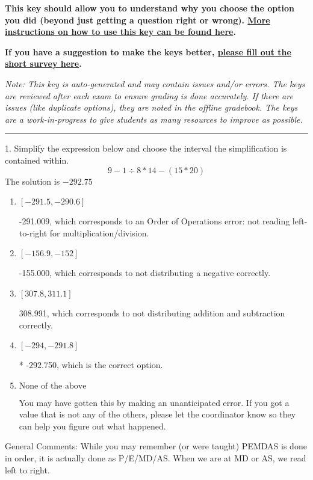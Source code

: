 \documentclass{article}[14pt]
\begin{document}
\textbf{This key should allow you to understand why you choose the option you did (beyond just getting a question right or wrong). \href{https://xronos.clas.ufl.edu/mac1105spring2020/courseDescriptionAndMisc/Exams/LearningFromResults}{More instructions on how to use this key can be found here}.}

\textbf{If you have a suggestion to make the keys better, \href{https://forms.gle/CZkbZmPbC9XALEE88}{please fill out the short survey here}.}

\textit{Note: This key is auto-generated and may contain issues and/or errors. The keys are reviewed after each exam to ensure grading is done accurately. If there are issues (like duplicate options), they are noted in the offline gradebook. The keys are a work-in-progress to give students as many resources to improve as possible.}

\rule{\textwidth}{0.4pt}

1. Simplify the expression below and choose the interval the simplification is contained within.
$$ 9 - 1 \div 8 * 14 - (15 * 20) $$ 
The solution is $ -292.75 $ 

\begin{enumerate}[label=\Alph*.] 
\item $ [-291.5, -290.6] $ 

  -291.009, which corresponds to an Order of Operations error: not reading left-to-right for multiplication/division. 
\item $ [-156.9, -152] $ 

  -155.000, which corresponds to not distributing a negative correctly. 
\item $ [307.8, 311.1] $ 

  308.991, which corresponds to not distributing addition and subtraction correctly. 
\item $ [-294, -291.8] $ 

 * -292.750, which is the correct option. 
\item $ \text{None of the above} $ 

  You may have gotten this by making an unanticipated error. If you got a value that is not any of the others, please let the coordinator know so they can help you figure out what happened. 
\end{enumerate} 
 
General Comments: While you may remember (or were taught) PEMDAS is done in order, it is actually done as P/E/MD/AS. When we are at MD or AS, we read left to right.
\end{document}
